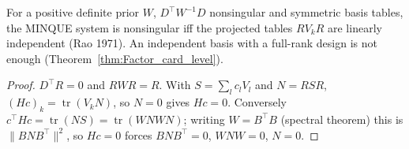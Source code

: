 \begin{theorem}\label{thm:minque_nonsingular}
  \leanok
  For a positive definite prior $W$, $D^\top W^{-1}D$ nonsingular and symmetric basis tables,
  the MINQUE system is nonsingular iff the projected tables $RV_kR$ are linearly independent
  (Rao 1971). An independent basis with a full-rank design is not enough
  (Theorem~\ref{thm:Factor_card_level}).
\end{theorem}
\begin{proof}
  \leanok
  $D^\top R = 0$ and $RWR = R$. With $S = \sum_lc_lV_l$ and $N = RSR$,
  $(Hc)_k = \operatorname{tr}(V_kN)$, so $N = 0$ gives $Hc = 0$. Conversely
  $c^\top Hc = \operatorname{tr}(NS) = \operatorname{tr}(WNWN)$; writing $W = B^\top B$ (spectral
  theorem) this is $\|BNB^\top\|^2$, so $Hc = 0$ forces $BNB^\top = 0$, $WNW = 0$, $N = 0$.
\end{proof}

